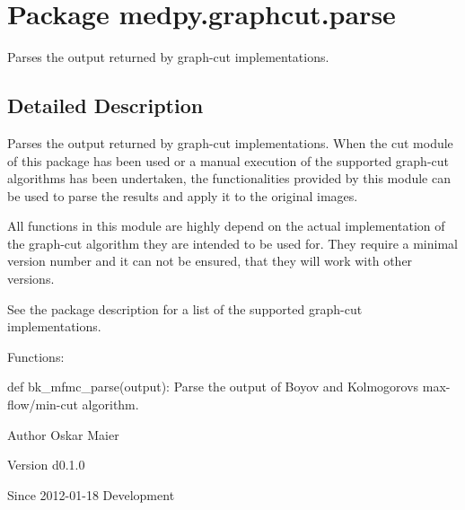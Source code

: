 \hypertarget{namespacemedpy_1_1graphcut_1_1parse}{
\section{Package medpy.graphcut.parse}
\label{namespacemedpy_1_1graphcut_1_1parse}
}


Parses the output returned by graph-\/cut implementations.  




\subsection{Detailed Description}
Parses the output returned by graph-\/cut implementations. When the cut module of this package has been used or a manual execution of the supported graph-\/cut algorithms has been undertaken, the functionalities provided by this module can be used to parse the results and apply it to the original images.

All functions in this module are highly depend on the actual implementation of the graph-\/cut algorithm they are intended to be used for. They require a minimal version number and it can not be ensured, that they will work with other versions.

See the package description for a list of the supported graph-\/cut implementations.

Functions:
\begin{DoxyItemize}
\item def bk\_\-mfmc\_\-parse(output): Parse the output of Boyov and Kolmogorovs max-\/flow/min-\/cut algorithm.
\end{DoxyItemize}

\begin{DoxyAuthor}{Author}
Oskar Maier 
\end{DoxyAuthor}
\begin{DoxyVersion}{Version}
d0.1.0 
\end{DoxyVersion}
\begin{DoxySince}{Since}
2012-\/01-\/18  Development 
\end{DoxySince}
